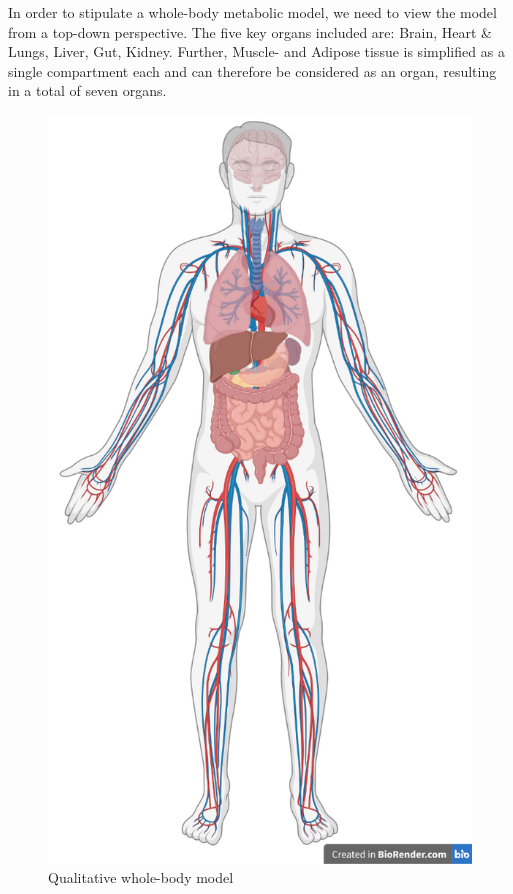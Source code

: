 \documentclass{IEEEtran}
\begin{document}
In order to stipulate a whole-body metabolic model, we need to view the model from a top-down perspective. The five key organs included are: Brain, Heart \& Lungs, Liver, Gut, Kidney. Further, Muscle- and Adipose tissue is simplified as a single compartment each and can therefore be considered as an organ, resulting in a total of seven organs.




\begin{figure}[H]
    \centering
    \includegraphics[width=0.8\columnwidth]{Diagrams/Qualitative whole body.png}
    \caption{Qualitative whole-body model}
    \label{fig:whole-body}
\end{figure}
\end{document}

